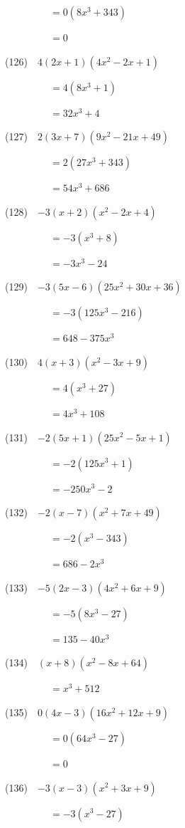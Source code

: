 \documentclass[a4j,twocolumn,10pt,fleqn]{jarticle}
\begin{document}
~~~~~~~~~$=0(8 x^{3} + 343)$

~~~~~~~~~$=0$

(126)~~$4\left(2 x + 1\right) \left(4 x^{2} - 2 x + 1\right)$

~~~~~~~~~$=4(8 x^{3} + 1)$

~~~~~~~~~$=32 x^{3} + 4$

(127)~~$2\left(3 x + 7\right) \left(9 x^{2} - 21 x + 49\right)$

~~~~~~~~~$=2(27 x^{3} + 343)$

~~~~~~~~~$=54 x^{3} + 686$

(128)~~$-3\left(x + 2\right) \left(x^{2} - 2 x + 4\right)$

~~~~~~~~~$=-3(x^{3} + 8)$

~~~~~~~~~$=- 3 x^{3} - 24$

(129)~~$-3\left(5 x - 6\right) \left(25 x^{2} + 30 x + 36\right)$

~~~~~~~~~$=-3(125 x^{3} - 216)$

~~~~~~~~~$=648 - 375 x^{3}$

(130)~~$4\left(x + 3\right) \left(x^{2} - 3 x + 9\right)$

~~~~~~~~~$=4(x^{3} + 27)$

~~~~~~~~~$=4 x^{3} + 108$

(131)~~$-2\left(5 x + 1\right) \left(25 x^{2} - 5 x + 1\right)$

~~~~~~~~~$=-2(125 x^{3} + 1)$

~~~~~~~~~$=- 250 x^{3} - 2$

(132)~~$-2\left(x - 7\right) \left(x^{2} + 7 x + 49\right)$

~~~~~~~~~$=-2(x^{3} - 343)$

~~~~~~~~~$=686 - 2 x^{3}$

(133)~~$-5\left(2 x - 3\right) \left(4 x^{2} + 6 x + 9\right)$

~~~~~~~~~$=-5(8 x^{3} - 27)$

~~~~~~~~~$=135 - 40 x^{3}$

(134)~~$\left(x + 8\right) \left(x^{2} - 8 x + 64\right)$

~~~~~~~~~$=x^{3} + 512$

(135)~~$0\left(4 x - 3\right) \left(16 x^{2} + 12 x + 9\right)$

~~~~~~~~~$=0(64 x^{3} - 27)$

~~~~~~~~~$=0$

(136)~~$-3\left(x - 3\right) \left(x^{2} + 3 x + 9\right)$

~~~~~~~~~$=-3(x^{3} - 27)$
\end{document}
